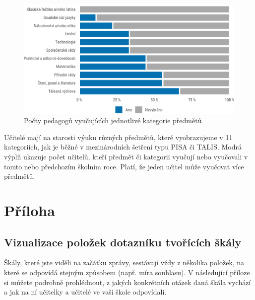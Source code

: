 \documentclass[12pt,a4paper,]{report}
\begin{document}
\begin{figure}

{\centering \includegraphics[width=\textwidth]{figs/subjects-1}

}

\caption{Počty pedagogů vyučujících jednotlivé kategorie předmětů}\label{fig:subjects}
\end{figure}

Učitelé mají na starosti výuku různých předmětů, které vyobrazujeme v 11 kategoriích, jak je běžné v mezinárodních šetření typu PISA či TALIS. Modrá výplň ukazuje počet učitelů, kteří předmět či kategorii vyučují nebo vyučovali v tomto nebo předchozím školním roce. Platí, že jeden učitel může vyučovat více předmětů.

\newpage

\hypertarget{pux159uxedloha}{%
\chapter{Příloha}\label{pux159uxedloha}}

\hypertarget{vizualizace-poloux17eek-dotaznuxedku-tvoux159uxedcuxedch-ux161kuxe1ly}{%
\section{Vizualizace položek dotazníku tvořících škály}\label{vizualizace-poloux17eek-dotaznuxedku-tvoux159uxedcuxedch-ux161kuxe1ly}}

Škály, které jste viděli na začátku zprávy, sestávají vždy z několika položek, na které se odpovídá stejným způsobem (např. míra souhlasu). V následující příloze si můžete podrobně prohlédnout, z jakých konkrétních otázek daná škála vychází a jak na ní učitelky a učitelé ve vaší škole odpovídali.
\end{document}
